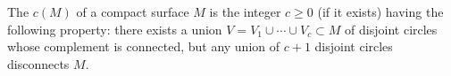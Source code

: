 The  $c(M)$ of a compact surface $M$ is the integer $c \geqslant 0$ (if it exists) having the following property: there exists a union $V = V_1 \cup \cdots \cup V_c \subset M$ of disjoint circles whose complement is connected, but any union of $c + 1$ disjoint circles disconnects $M$.
